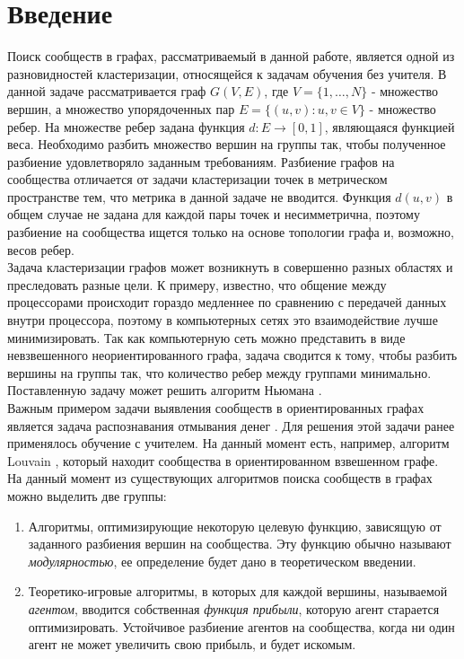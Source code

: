 \chapter{Введение}

Поиск сообществ в графах, рассматриваемый в данной работе, является одной из разновидностей кластеризации, относящейся к задачам обучения без учителя. В данной задаче рассматривается граф $G(V, E)$, где $V=\{1,\dots,N\}$ - множество вершин, а множество упорядоченных пар $E=\{(u,v): u,v\in V\}$ - множество ребер. На множестве ребер задана функция $d:E\rightarrow [0,1]$, являющаяся функцией веса. Необходимо разбить множество вершин на группы так, чтобы полученное разбиение удовлетворяло заданным требованиям. Разбиение графов на сообщества отличается от задачи кластеризации точек в метрическом пространстве тем, что метрика в данной задаче не вводится. Функция $d(u,v)$ в общем случае не задана для каждой пары точек и несимметрична, поэтому разбиение на сообщества ищется только на основе топологии графа и, возможно, весов ребер. \\

Задача кластеризации графов может возникнуть в совершенно разных областях и преследовать разные цели. К примеру, известно, что общение между процессорами происходит гораздо медленнее по сравнению с передачей данных внутри процессора, поэтому в компьютерных сетях это взаимодействие лучше минимизировать. Так как компьютерную сеть можно представить в виде невзвешенного неориентированного графа, задача сводится к тому, чтобы разбить вершины на группы так, что количество ребер между группами минимально. Поставленную задачу может решить алгоритм Ньюмана \cite{Newman2004}.\\

Важным примером задачи выявления сообществ в ориентированных графах является задача распознавания отмывания денег \cite{ml}. Для решения этой задачи ранее применялось обучение с учителем. На данный момент есть, например, алгоритм Louvain \cite{ml1}, который находит сообщества в ориентированном взвешенном графе.\\

На данный момент из существующих алгоритмов поиска сообществ в графах можно выделить две группы: 
\begin{enumerate}
	\item Алгоритмы, оптимизирующие некоторую целевую функцию, зависящую от заданного разбиения вершин на сообщества. Эту функцию обычно называют \textit{модулярностью}, ее определение будет дано в теоретическом введении.
	
	\item Теоретико-игровые алгоритмы, в которых для каждой вершины, называемой \textit{агентом}, вводится собственная \textit{функция прибыли}, которую агент старается оптимизировать. Устойчивое разбиение агентов на сообщества, когда ни один агент не может увеличить свою прибыль, и будет искомым.
\end{enumerate} 

